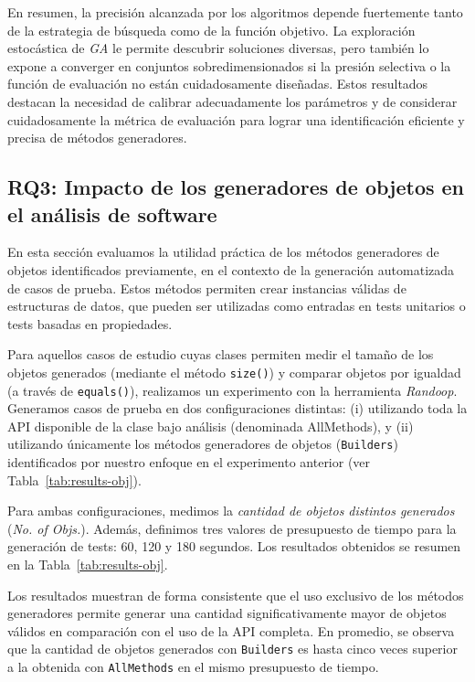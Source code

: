 En resumen, la precisión alcanzada por los algoritmos depende fuertemente tanto de la estrategia de búsqueda como de la función objetivo. 
La exploración estocástica de \emph{GA} le permite descubrir soluciones diversas, 
pero también lo expone a converger en conjuntos sobredimensionados si la presión selectiva o la función de evaluación no están cuidadosamente diseñadas. 
Estos resultados destacan la necesidad de calibrar adecuadamente los parámetros y de considerar cuidadosamente la métrica de evaluación para lograr una identificación eficiente y precisa de métodos generadores.


\subsection{RQ3: Impacto de los generadores de objetos en el análisis de
software}

En esta sección evaluamos la utilidad práctica de los métodos generadores de objetos 
identificados previamente, en el contexto de la generación automatizada de casos de prueba. 
Estos métodos permiten crear instancias válidas de estructuras de datos, que pueden ser utilizadas como 
entradas en tests unitarios o tests basadas en propiedades.

Para aquellos casos de estudio cuyas clases permiten medir el tamaño de los objetos generados 
(mediante el método \texttt{size()}) y comparar objetos por igualdad (a través de \texttt{equals()}), 
realizamos un experimento con la herramienta \emph{Randoop}. Generamos casos de prueba en dos 
configuraciones distintas: (i) utilizando toda la API disponible de la clase bajo análisis 
(denominada \texttt{}{AllMethods}), y (ii) utilizando únicamente los métodos generadores de objetos
(\texttt{Builders}) identificados por nuestro enfoque en el experimento anterior 
(ver Tabla~\ref{tab:results-obj}).

Para ambas configuraciones, medimos la \textit{cantidad de objetos distintos 
generados} (\textit{No. of Objs.}). Además, definimos tres valores de presupuesto de tiempo para la generación de 
tests: 60, 120 y 180 segundos. Los resultados obtenidos se resumen en la Tabla~\ref{tab:results-obj}.

Los resultados muestran de forma consistente que el uso exclusivo de los métodos generadores 
permite generar una cantidad significativamente mayor de objetos válidos en comparación con el uso 
de la API completa. En promedio, se observa que la cantidad de objetos generados con \texttt{Builders} 
es hasta cinco veces superior a la obtenida con \texttt{AllMethods} en el mismo presupuesto de tiempo. 

